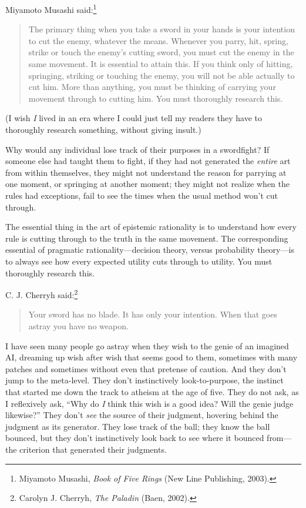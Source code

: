 {
 Miyamoto Musashi said:\footnote{Miyamoto Musashi, \textit{Book of Five Rings} (New Line
Publishing, 2003).}}

\begin{quote}
{
 The primary thing when you take a sword in your hands is your
intention to cut the enemy, whatever the means. Whenever you parry,
hit, spring, strike or touch the enemy's cutting sword,
you must cut the enemy in the same movement. It is essential to attain
this. If you think only of hitting, springing, striking or touching the
enemy, you will not be able actually to cut him. More than anything,
you must be thinking of carrying your movement through to cutting him.
You must thoroughly research this.}
\end{quote}

{
 (I wish \textit{I} lived in an era where I could just tell my
readers they have to thoroughly research something, without giving
insult.)}

{
 Why would any individual lose track of their purposes in a
swordfight? If someone else had taught them to fight, if they had not
generated the \textit{entire} art from within themselves, they might
not understand the reason for parrying at one moment, or springing at
another moment; they might not realize when the rules had exceptions,
fail to see the times when the usual method won't cut
through.}

{
 The essential thing in the art of epistemic rationality is to
understand how every rule is cutting through to the truth in the same
movement. The corresponding essential of pragmatic
rationality---decision theory, versus probability theory---is to always
see how every expected utility cuts through to utility. You must
thoroughly research this.}

{
 C. J. Cherryh said:\footnote{Carolyn J. Cherryh, \textit{The Paladin} (Baen, 2002).}}

\begin{quote}
{
 Your sword has no blade. It has only your intention. When that
 goes astray you have no weapon.}
\end{quote}

{
 I have seen many people go astray when they wish to the genie of
an imagined AI, dreaming up wish after wish that seems good to them,
sometimes with many patches and sometimes without even that pretense of
caution. And they don't jump to the meta-level. They
don't instinctively look-to-purpose, the instinct that
started me down the track to atheism at the age of five. They do not
ask, as I reflexively ask, ``Why do \textit{I} think
this wish is a good idea? Will the genie judge
likewise?'' They don't \textit{see}
the source of their judgment, hovering behind the judgment as its
generator. They lose track of the ball; they know the ball bounced, but
they don't instinctively look back to see where it
bounced from---the criterion that generated their judgments.}

